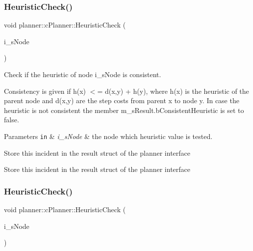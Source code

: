 \subsubsection{\texorpdfstring{Heuristic\+Check()}{HeuristicCheck()}\hspace{0.1cm}{\footnotesize\ttfamily [1/2]}}
{\footnotesize\ttfamily void planner\+::c\+Planner\+::\+Heuristic\+Check (\begin{DoxyParamCaption}\item[{std\+::shared\+\_\+ptr$<$ \mbox{\hyperlink{structplanner_1_1t_node}{t\+Node}} $>$ \&}]{i\+\_\+s\+Node }\end{DoxyParamCaption})}



Check if the heuristic of node i\+\_\+s\+Node is consistent. 

Consistency is given if h(x) $<$= d(x,y) + h(y), where h(x) is the heuristic of the parent node and d(x,y) are the step costs from parent x to node y. In case the heuristic is not consistent the member m\+\_\+s\+Result.\+b\+Consistent\+Heuristic is set to false. 
\begin{DoxyParams}[1]{Parameters}
\mbox{\tt in}  & {\em i\+\_\+s\+Node} & the node which heuristic value is tested. \\
\hline
\end{DoxyParams}
Store this incident in the result struct of the planner interface

Store this incident in the result struct of the planner interface \mbox{\label{classplanner_1_1c_planner_a1234d075676fcaa2c17b859d11b4638c}} 
\subsubsection{\texorpdfstring{Heuristic\+Check()}{HeuristicCheck()}\hspace{0.1cm}{\footnotesize\ttfamily [2/2]}}
{\footnotesize\ttfamily void planner\+::c\+Planner\+::\+Heuristic\+Check (\begin{DoxyParamCaption}\item[{std\+::shared\+\_\+ptr$<$ \mbox{\hyperlink{structplanner_1_1t_node}{t\+Node}} $>$ \&}]{i\+\_\+s\+Node }\end{DoxyParamCaption})}



